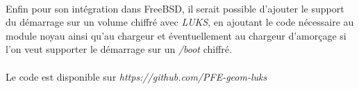 \paragraph{}
Enfin pour son intégration dans FreeBSD, il serait possible d'ajouter le support
du démarrage sur un volume chiffré avec {\em LUKS}, en ajoutant le code nécessaire
au module noyau ainsi qu'au chargeur et éventuellement au chargeur d'amorçage
si l'on veut supporter le démarrage sur un {\em /boot} chiffré.

\paragraph{}
Le code est disponible sur {\em https://github.com/PFE-geom-luks}
